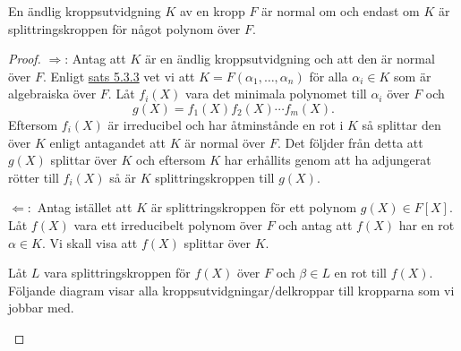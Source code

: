 \documentclass{article}
\theoremstyle{definition}
\begin{document}
\hypertarget{sats6.3.1}{}
\begin{mytheo}{}{}
  En ändlig kroppsutvidgning $K$ av en kropp $F$ är normal om och endast om $K$ är splittringskroppen för något polynom över $F.$
\end{mytheo}
\begin{proof}
  $\Rightarrow$: Antag att $K$ är en ändlig kroppsutvidgning och att den är normal över $F$. Enligt \hyperlink{sats5.3.3}{sats 5.3.3}
  vet vi att $K = F(\alpha_1, \ldots, \alpha_n)$ för alla $\alpha_i \in K$ som är algebraiska över $F.$ Låt $f_i(X)$ vara det minimala polynomet 
  till $\alpha_i$ över $F$ och 
  \[g(X) = f_1(X) f_2(X) \cdots f_m(X).\] 
  Eftersom $f_i(X)$ är irreducibel och har åtminstånde en rot i $K$ så splittar den över $K$ enligt antagandet att $K$ är normal över $F$. Det följder från detta 
  att $g(X)$ splittar över $K$ och eftersom $K$ har erhållits genom att ha adjungerat rötter till $f_i(X)$ så är $K$ splittringskroppen till $g(X).$

  $\Leftarrow:$ Antag istället att $K$ är splittringskroppen för ett polynom $g(X) \in F[X]$. Låt $f(X)$ vara ett irreducibelt polynom över $F$ och antag 
  att $f(X)$ har en rot $\alpha \in K$. Vi skall visa att $f(X)$ splittar över $K$.
  
  Låt $L$ vara splittringskroppen för $f(X)$ över $F$ och $\beta \in L$ en rot till $f(X)$. Följande diagram visar alla kroppsutvidgningar/delkroppar 
  till kropparna som vi jobbar med. 


  \begin{center}
    \newcommand{\mydistance}{.6cm}
\end{center}
\end{proof}
\end{document}
